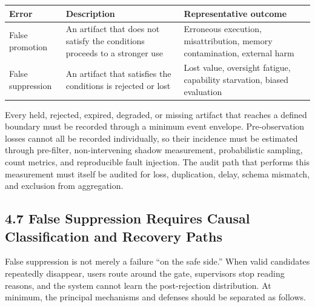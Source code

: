 {\def\LTcaptype{none} %
\begin{longtable}[]{@{}
  >{\raggedright\arraybackslash}p{}
  >{\raggedright\arraybackslash}p{}
  >{\raggedright\arraybackslash}p{}@{}}
\toprule\noalign{}
\begin{minipage}[b]{\linewidth}\raggedright
Error
\end{minipage} & \begin{minipage}[b]{\linewidth}\raggedright
Description
\end{minipage} & \begin{minipage}[b]{\linewidth}\raggedright
Representative outcome
\end{minipage} \\
\midrule\noalign{}
\endhead
\bottomrule\noalign{}
\endlastfoot
False promotion & An artifact that does not satisfy the conditions proceeds to a stronger use & Erroneous execution, misattribution, memory contamination, external harm \\
False suppression & An artifact that satisfies the conditions is rejected or lost & Lost value, oversight fatigue, capability starvation, biased evaluation \\
\end{longtable}
}

Every held, rejected, expired, degraded, or missing artifact that reaches a defined boundary must be recorded through a minimum event envelope. Pre-observation losses cannot all be recorded individually, so their incidence must be estimated through pre-filter, non-intervening shadow measurement, probabilistic sampling, count metrics, and reproducible fault injection. The audit path that performs this measurement must itself be audited for loss, duplication, delay, schema mismatch, and exclusion from aggregation.

\subsection{4.7 False Suppression Requires Causal Classification and Recovery Paths}\label{false-suppression-requires-causal-classification-and-recovery-paths}

False suppression is not merely a failure ``on the safe side.'' When valid candidates repeatedly disappear, users route around the gate, supervisors stop reading reasons, and the system cannot learn the post-rejection distribution. At minimum, the principal mechanisms and defenses should be separated as follows.

